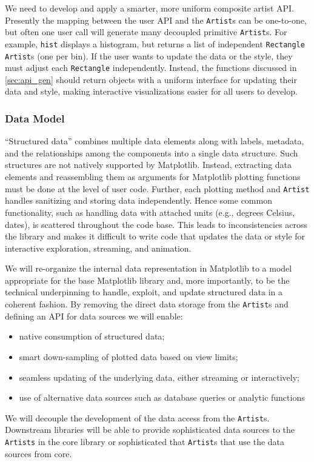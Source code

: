 \documentclass[11pt]{article}  %
\begin{document}
We need to develop and apply a smarter, more uniform composite artist API.
Presently the mapping between the user API and the \texttt{Artist}s can be
one-to-one, but often one user call will generate many decoupled
primitive \texttt{Artist}s.  For example, \texttt{hist} displays a histogram,
but returns a list of independent \texttt{Rectangle} \texttt{Artist}s
(one per bin).  If the user wants to update the data or the style,
they must adjust each \texttt{Rectangle} independently. Instead, the
functions discussed in \ref{sec:api_gen} should return objects with
a uniform interface for updating their data and style, making
interactive visualizations easier for all users to develop.


\subsubsection{Data Model}
\label{sec:dm}

``Structured data'' combines multiple data elements along with labels,
metadata, and the
relationships among the components into a single data structure. Such
structures are not natively supported by Matplotlib.  Instead, extracting
data elements and reassembling them as arguments for Matplotlib plotting
functions must be done at the level of user code.
Further, each plotting method and \texttt{Artist} handles sanitizing
and storing data independently.  Hence some common
functionality, such as handling data with attached units (e.g.,
degrees Celsius, dates), is scattered throughout the code base.  This
leads to inconsistencies across the library and makes it difficult to
write code that updates the data or style for interactive exploration,
streaming, and animation.


We will re-organize the internal data representation in Matplotlib to
a model appropriate for the base Matplotlib library and, more
importantly, to be the technical underpinning to handle, exploit, and
update structured data in a coherent fashion.
By removing the direct data storage from
the \texttt{Artist}s and defining an API for data sources we will enable:
\begin{itemize}[noitemsep]
  \item native consumption of structured data;
  \item smart down-sampling of plotted data based on view limits;
  \item seamless updating of the underlying data, either
    streaming or interactively;
  \item use of alternative data sources such as database queries or analytic functions
\end{itemize}
We will decouple the development of the data access from the
\texttt{Artist}s.  Downstream libraries will be able to provide
sophisticated data sources to the \texttt{Artists} in the core library
or sophisticated that \texttt{Artist}s that use the data sources from
core.
\end{document}
